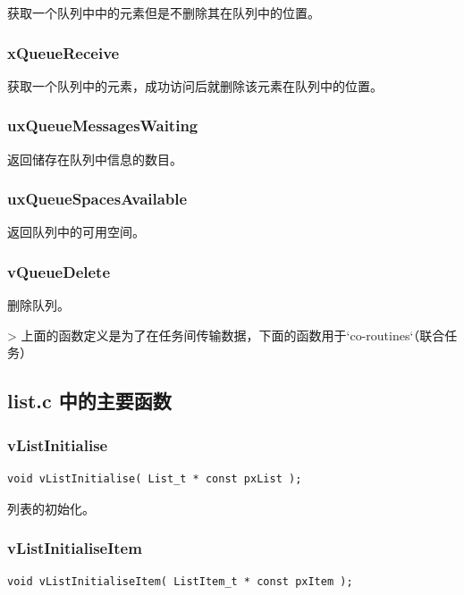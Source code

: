 \documentclass[12pt, a4paper]{article}
\begin{document}
获取一个队列中中的元素但是不删除其在队列中的位置。

\subsubsection {xQueueReceive}

获取一个队列中的元素，成功访问后就删除该元素在队列中的位置。

\subsubsection {uxQueueMessagesWaiting}

返回储存在队列中信息的数目。

\subsubsection {uxQueueSpacesAvailable}

返回队列中的可用空间。

\subsubsection {vQueueDelete}

删除队列。

> 上面的函数定义是为了在任务间传输数据，下面的函数用于`co-routines`（联合任务）

\subsection {list.c 中的主要函数}

\subsubsection {vListInitialise}

\begin{lstlisting}[language={[ANSI]C},keywordstyle=\color{blue!70},commentstyle=\color{red!50!green!50!blue!50},frame=shadowbox, rulesepcolor=\color{red!20!green!20!blue!20}]
void vListInitialise( List_t * const pxList );
\end{lstlisting}

列表的初始化。

\subsubsection {vListInitialiseItem}

\begin{lstlisting}[language={[ANSI]C},keywordstyle=\color{blue!70},commentstyle=\color{red!50!green!50!blue!50},frame=shadowbox, rulesepcolor=\color{red!20!green!20!blue!20}]
void vListInitialiseItem( ListItem_t * const pxItem );
\end{lstlisting}
\end{document}
